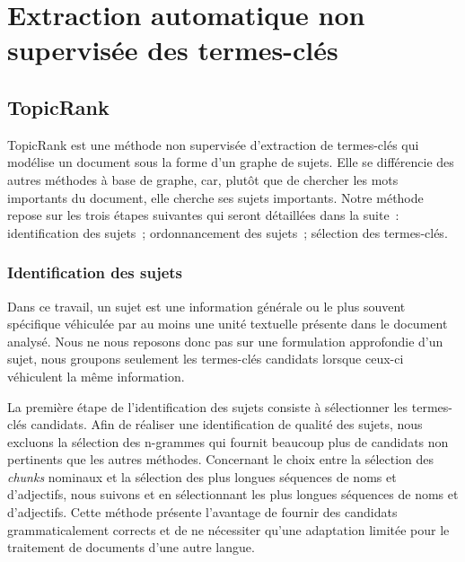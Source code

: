 
  \section{Extraction automatique non supervisée des termes-clés}
  \label{sec:main-automatic_keyphrase_annotation-unsupervised_automatic_keyphrase_extraction}
    \subsection{TopicRank}
    \label{subsec:main-automatic_keyphrase_annotation-unsupervised_automatic_keyphrase_extraction-topicrank}
      TopicRank est une méthode non supervisée d'extraction de termes-clés qui
      modélise un document sous la forme d'un graphe de sujets.
      Elle se différencie des autres méthodes à base de graphe, car, plutôt que
      de chercher les mots importants du document, elle cherche ses sujets
      importants.
      Notre méthode repose sur les trois étapes suivantes qui seront détaillées
      dans la suite~: identification des sujets~; ordonnancement des sujets~;
      sélection des termes-clés.

      \subsubsection{Identification des sujets}
      \label{subsubsec:main-automatic_keyphrase_annotation-unsupervised_automatic_keyphrase_extraction-topicrank-topic_identification}
        Dans ce travail, un sujet est une information générale ou le plus
        souvent spécifique véhiculée par au moins une unité textuelle présente
        dans le document analysé. Nous ne nous reposons donc pas sur une
        formulation approfondie d'un sujet, nous groupons seulement les
        termes-clés candidats lorsque ceux-ci véhiculent la même information.

        La première étape de l'identification des sujets consiste à sélectionner
        les termes-clés candidats.
        Afin de réaliser une identification de qualité des sujets, nous excluons
        la sélection des n-grammes qui fournit beaucoup plus de candidats non
        pertinents que les autres méthodes. Concernant le choix entre la
        sélection des \textit{chunks} nominaux et la sélection des plus longues
        séquences de noms et d'adjectifs, nous suivons
         et  en
        sélectionnant les plus longues séquences de noms et d'adjectifs. Cette
        méthode présente l'avantage de fournir des candidats grammaticalement
        corrects et de ne nécessiter qu'une adaptation limitée pour le
        traitement de documents d'une autre langue.

